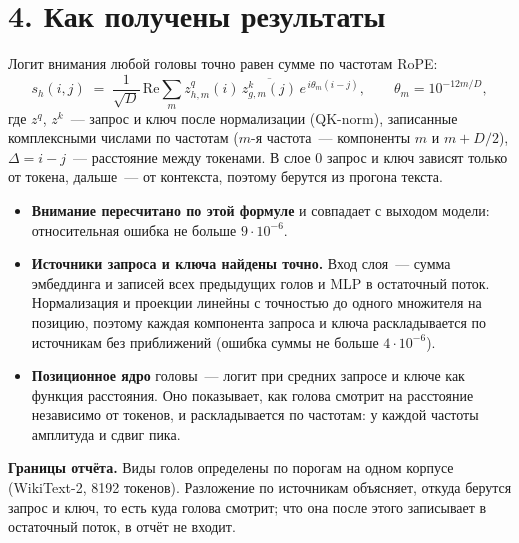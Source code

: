 \documentclass[10pt]{article}
\begin{document}
\section*{4. Как получены результаты}
Логит внимания любой головы точно равен сумме по частотам RoPE:
\[ s_h(i,j) \;=\; \frac{1}{\sqrt{D}}\,\mathrm{Re}\sum_{m} z^{q}_{h,m}(i)\,\overline{z^{k}_{g,m}(j)}\,e^{\,i\theta_m (i-j)}, \qquad \theta_m = 10^{-12m/D}, \]
где $z^q$, $z^k$~— запрос и ключ после нормализации (QK-norm), записанные комплексными числами по частотам ($m$-я частота~— компоненты $m$ и $m+D/2$), $\Delta=i-j$~— расстояние между токенами. В слое 0 запрос и ключ зависят только от токена, дальше~— от контекста, поэтому берутся из прогона текста.
\begin{itemize}
\item \textbf{Внимание пересчитано по этой формуле} и совпадает с выходом модели: относительная ошибка не больше $9\cdot 10^{-6}$.
\item \textbf{Источники запроса и ключа найдены точно.} Вход слоя~— сумма эмбеддинга и записей всех предыдущих голов и MLP в остаточный поток. Нормализация и проекции линейны с точностью до одного множителя на позицию, поэтому каждая компонента запроса и ключа раскладывается по источникам без приближений (ошибка суммы не больше $4\cdot 10^{-6}$).
\item \textbf{Позиционное ядро} головы~— логит при средних запросе и ключе как функция расстояния. Оно показывает, как голова смотрит на расстояние независимо от токенов, и раскладывается по частотам: у каждой частоты амплитуда и сдвиг пика.
\end{itemize}
\textbf{Границы отчёта.} Виды голов определены по порогам на одном корпусе (WikiText-2, 8192 токенов). Разложение по источникам объясняет, откуда берутся запрос и ключ, то есть куда голова смотрит; что она после этого записывает в остаточный поток, в отчёт не входит.
\end{document}
